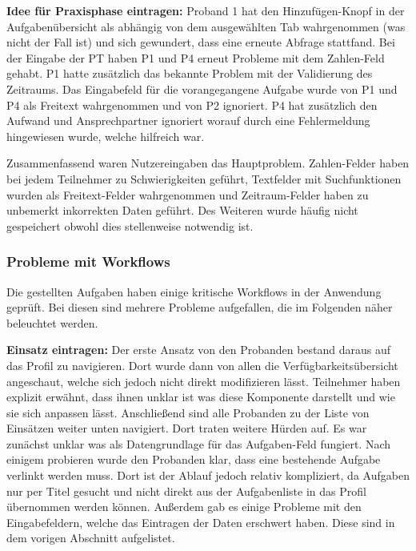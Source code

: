 \documentclass[
  12pt,
  ngerman,
  a4paper,
]{article}
\begin{document}
\textbf{Idee für Praxisphase eintragen:} Proband 1 hat den
Hinzufügen-Knopf in der Aufgabenübersicht als abhängig von dem
ausgewählten Tab wahrgenommen (was nicht der Fall ist) und sich
gewundert, dass eine erneute Abfrage stattfand. Bei der Eingabe der PT
haben P1 und P4 erneut Probleme mit dem Zahlen-Feld gehabt. P1 hatte
zusätzlich das bekannte Problem mit der Validierung des Zeitraums. Das
Eingabefeld für die vorangegangene Aufgabe wurde von P1 und P4 als
Freitext wahrgenommen und von P2 ignoriert. P4 hat zusätzlich den
Aufwand und Ansprechpartner ignoriert worauf durch eine Fehlermeldung
hingewiesen wurde, welche hilfreich war.

Zusammenfassend waren Nutzereingaben das Hauptproblem. Zahlen-Felder
haben bei jedem Teilnehmer zu Schwierigkeiten geführt, Textfelder mit
Suchfunktionen wurden als Freitext-Felder wahrgenommen und
Zeitraum-Felder haben zu unbemerkt inkorrekten Daten geführt. Des
Weiteren wurde häufig nicht gespeichert obwohl dies stellenweise
notwendig ist.

\hypertarget{probleme-mit-workflows}{%
\subsubsection{Probleme mit Workflows}\label{probleme-mit-workflows}}

Die gestellten Aufgaben haben einige kritische Workflows in der
Anwendung geprüft. Bei diesen sind mehrere Probleme aufgefallen, die im
Folgenden näher beleuchtet werden.

\textbf{Einsatz eintragen:} Der erste Ansatz von den Probanden bestand
daraus auf das Profil zu navigieren. Dort wurde dann von allen die
Verfügbarkeitsübersicht angeschaut, welche sich jedoch nicht direkt
modifizieren lässt. Teilnehmer haben explizit erwähnt, dass ihnen unklar
ist was diese Komponente darstellt und wie sie sich anpassen lässt.
Anschließend sind alle Probanden zu der Liste von Einsätzen weiter unten
navigiert. Dort traten weitere Hürden auf. Es war zunächst unklar was
als Datengrundlage für das Aufgaben-Feld fungiert. Nach einigem
probieren wurde den Probanden klar, dass eine bestehende Aufgabe
verlinkt werden muss. Dort ist der Ablauf jedoch relativ kompliziert, da
Aufgaben nur per Titel gesucht und nicht direkt aus der Aufgabenliste in
das Profil übernommen werden können. Außerdem gab es einige Probleme mit
den Eingabefeldern, welche das Eintragen der Daten erschwert haben.
Diese sind in dem vorigen Abschnitt aufgelistet.
\end{document}

